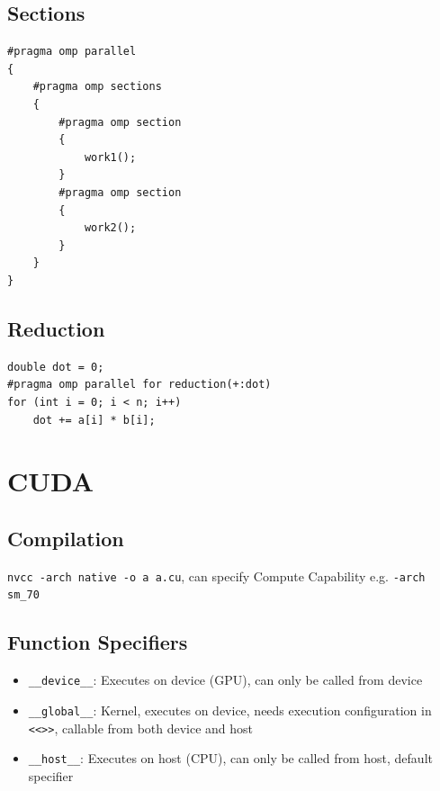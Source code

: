 \documentclass{article}
\begin{document}
\subsection{Sections}
\begin{lstlisting}
#pragma omp parallel
{
    #pragma omp sections
    {
        #pragma omp section
        {
            work1();
        }
        #pragma omp section
        {
            work2();
        }
    }
}
\end{lstlisting}

\subsection{Reduction}
\begin{lstlisting}
double dot = 0;
#pragma omp parallel for reduction(+:dot)
for (int i = 0; i < n; i++)
    dot += a[i] * b[i];
\end{lstlisting}

\section{CUDA}

\subsection{Compilation}
\texttt{nvcc -arch native -o a a.cu}, can specify Compute Capability e.g. \texttt{-arch sm\_70}

\subsection{Function Specifiers}
\begin{itemize}
    \item \texttt{\_\_device\_\_}: Executes on device (GPU), can only be called from device
    \item \texttt{\_\_global\_\_}: Kernel, executes on device, needs execution configuration in \texttt{<<>>}, callable from both device and host
    \item \texttt{\_\_host\_\_}: Executes on host (CPU), can only be called from host, default specifier
\end{itemize}
\end{document}
